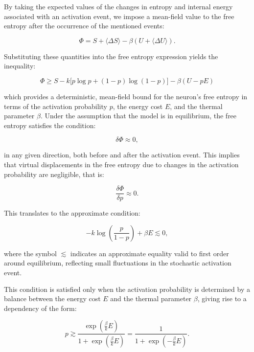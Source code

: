 \documentclass[12pt]{article}
\begin{document}
By taking the expected values of the changes in entropy and internal energy associated with an activation event, we impose a mean-field value to the free entropy after the occurrence of the mentioned events:

\begin{equation}
\Phi = S + \langle \Delta S \rangle - \beta (U + \langle \Delta U\rangle).
\end{equation}

Substituting these quantities into the free entropy expression yields the inequality:

\begin{equation}
\Phi \ge S - k \big[ p \log p + (1-p) \log(1-p) \big] - \beta (U - p E)
\end{equation}

which provides a deterministic, mean-field bound for the neuron’s free entropy in terms of the activation probability $p$, the energy cost $E$, and the thermal parameter $\beta$. Under the assumption that the model is in equilibrium, the free entropy satisfies the condition:

\begin{equation}
\delta \Phi \approx 0,
\end{equation}

in any given direction, both before and after the activation event. This implies that virtual displacements in the free entropy due to changes in the activation probability are negligible, that is:

\begin{equation}
\frac{\delta \Phi}{\delta p} \approx 0.
\end{equation}

This translates to the approximate condition:

\begin{equation}
- k \log \left( \frac{p}{1-p} \right) + \beta E \lesssim 0,
\end{equation}

where the symbol $\lesssim$ indicates an approximate equality valid to first order around equilibrium, reflecting small fluctuations in the stochastic activation event.

This condition is satisfied only when the activation probability is determined by a balance between the energy cost $E$ and the thermal parameter $\beta$, giving rise to a dependency of the form:

\begin{equation}
p \gtrsim \frac{\exp\left(\frac{\beta}{k} E\right)}{1 + \exp\left(\frac{\beta}{k} E\right)} = \frac{1}{1 + \exp\left(-\frac{\beta}{k} E\right)}.
\end{equation}
\end{document}
